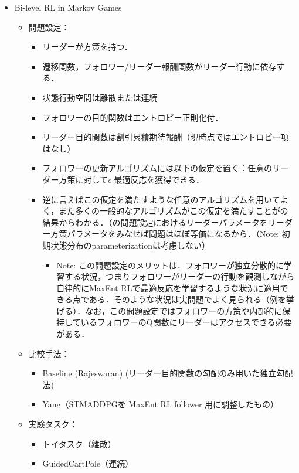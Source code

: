 \documentclass[a4paper,10pt,dvipdfmx]{jsarticle}
\begin{document}
\begin{itemize}
\begin{itemize}
\begin{itemize}
            \item Tax Design\cite{Thoma2024-em}（連続）
        \end{itemize}
    \end{itemize}
    \item Bi-level RL in Markov Games
    \begin{itemize}
        \item 問題設定：
        \begin{itemize}
            \item リーダーが方策を持つ．
            \item 遷移関数，フォロワー/リーダー報酬関数がリーダー行動に依存する．
            \item 状態行動空間は離散または連続
            \item フォロワーの目的関数はエントロピー正則化付．
            \item リーダー目的関数は割引累積期待報酬（現時点ではエントロピー項はなし）
             \item フォロワーの更新アルゴリズムには以下の仮定を置く：任意のリーダー方策に対して$\epsilon$-最適反応を獲得できる．
             \item 逆に言えばこの仮定を満たすような任意のアルゴリズムを用いてよく，また多くの一般的なアルゴリズムがこの仮定を満たすことが\cite{Thoma2024-em}の結果からわかる．（\cite{Thoma2024-em}の問題設定におけるリーダーパラメータをリーダー方策パラメータをみなせば問題はほぼ等価になるから．（Note: 初期状態分布のparameterizationは考慮しない）
            \begin{itemize}
                \item Note: この問題設定のメリットは．フォロワーが独立分散的に学習する状況，つまりフォロワーがリーダーの行動を観測しながら自律的にMaxEnt RLで最適反応を学習するような状況に適用できる点である．そのような状況は実問題でよく見られる（例を挙げる）．なお，この問題設定ではフォロワーの方策や内部的に保持しているフォロワーのQ関数にリーダーはアクセスできる必要がある．
            \end{itemize}
        \end{itemize}
        \item 比較手法：
        \begin{itemize}
            \item Baseline (Rajeswaran\cite{Rajeswaran-ym}) (リーダー目的関数の勾配のみ用いた独立勾配法)
            \item Yang\cite{Yang2023-tf}（STMADDPGを MaxEnt RL follower 用に調整したもの）
        \end{itemize}
        \item 実験タスク：
        \begin{itemize}
            \item トイタスク（離散）
            \item GuidedCartPole（連続）
        \end{itemize}
    \end{itemize}
\end{itemize}
\end{document}
